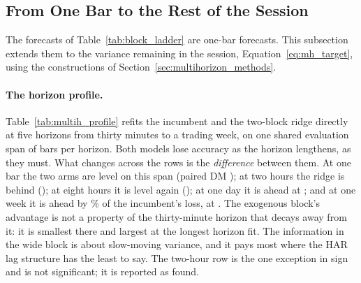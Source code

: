 \subsection{From One Bar to the Rest of the Session}
\label{sec:multihorizon}
\label{sec:multihorizon_results}

The forecasts of Table~\ref{tab:block_ladder} are one-bar forecasts.
This subsection extends them to the variance remaining in the session,
Equation~\eqref{eq:mh_target}, using the constructions of
Section~\ref{sec:multihorizon_methods}.

\iffalse
\paragraph{The horizon profile.} Table~\ref{tab:multih_profile} refits
the incumbent and the two-block ridge directly at five horizons from
thirty minutes to a trading week, on one shared evaluation span of
\mhpNBars{} bars per horizon. Both models lose accuracy as the horizon
lengthens, as they must. What changes across the rows is the
\emph{difference} between them. At one bar the two arms are level on
this span (paired DM \mhpHOneBlkDM{}); at two hours the ridge is behind
(\mhpHFourBlkDM{}); at eight hours it is level again
(\mhpHSixteenBlkDM{}); at one day it is ahead at
\mhpHFortyEightBlkDM{}; and at one week it is ahead by
\mhpHTwoFortyBlkRel{}\% of the incumbent's loss, at
\mhpHTwoFortyBlkDM{}. The exogenous block's advantage is not a property
of the thirty-minute horizon that decays away from it: it is smallest
there and largest at the longest horizon fit. The information in the
wide block is about slow-moving variance, and it pays most where the
HAR lag structure has the least to say. The two-hour row is the one
exception in sign and is not significant; it is reported as found.

